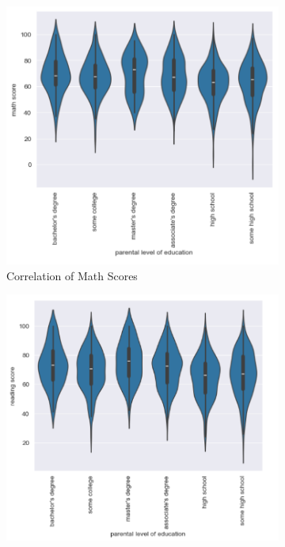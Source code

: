 \documentclass[fleqn,10pt]{olplainarticle}
\begin{document}
\begin{figure}[h!]
    \centering
    \caption{Correlations of Parent Education to Student Subject Scores}
    \begin{subfigure}{0.3\textwidth}
    \includegraphics[width=\linewidth]{MathVsParent.png}
    \caption{Correlation of Math Scores}
    \label{fig:1.a}
    \end{subfigure}
    \begin{subfigure}{0.3\textwidth}
    \includegraphics[width=\linewidth]{ReadingVsParent.png}

\end{subfigure}
\end{figure}
\end{document}
